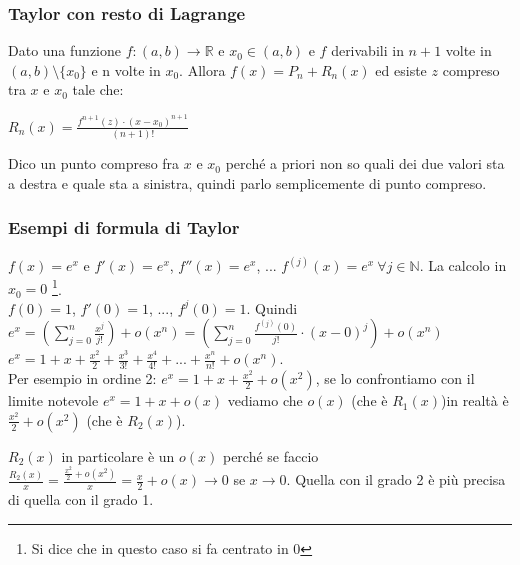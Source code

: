 \subsubsection{Taylor con resto di Lagrange}
\begin{definition}
Dato una funzione $f:(a,b) \to \mathbb{R}$ e $x_0 \in (a,b)$ e $f$ derivabili in $n+1$ volte in $(a,b) \setminus \{x_0\}$ e n volte in $x_0$. Allora $f(x) = P_n + R_n(x)$ ed esiste $z$ compreso tra $x$ e $x_0$ tale che:
\begin{center}
    $R_n(x) = \frac{f^{n+1}(z) \cdot (x - x_0)^{n+1}}{(n+1)!}$
\end{center}
\end{definition}
\hspace{-15pt}Dico un punto compreso fra $x$ e $x_0$ perché a priori non so quali dei due valori sta a destra e quale sta a sinistra, quindi parlo semplicemente di punto compreso.

\subsubsection{Esempi di formula di Taylor}
\begin{example}
$f(x) = e^x$ e $f'(x) = e^x$, $f''(x) = e^x$, ... $f^{(j)}(x) = e^x \: \forall j \in \mathbb{N}$. La calcolo in $x_0 = 0$ \footnote{Si dice che in questo caso si fa centrato in 0}.\\
$f(0) = 1$, $f'(0) = 1$, ..., $f^{j}(0) = 1$. Quindi $e^x = (\sum\limits_{j=0}^n\frac{x^j}{j!}) + o(x^n) = (\sum\limits_{j=0}^n\frac{f^{(j)}(0)}{j!}\cdot (x-0)^j) + o(x^n)$\\
$e^x = 1 + x + \frac{x^2}{2} + \frac{x^3}{3!} + \frac{x^4}{4!} + ... + \frac{x^n}{n!} + o(x^n)$.\\
Per esempio in ordine 2: $e^x = 1 + x + \frac{x^2}{2} + o(x^2)$, se lo confrontiamo con il limite notevole $e^x = 1 + x + o(x)$ vediamo che $o(x)$ (che è $R_1(x)$)in realtà è $\frac{x^2}{2} + o(x^2)$ (che è $R_2(x)$).
\end{example}
\begin{observation}
$R_2(x)$ in particolare è un $o(x)$ perché se faccio $\frac{R_2(x)}{x} = \frac{\frac{x^2}{2} + o(x^2)}{x} = \frac{x}{2} + o(x) \to 0$ se $x\to 0$.
Quella con il grado 2 è più precisa di quella con il grado 1.
\end{observation}


